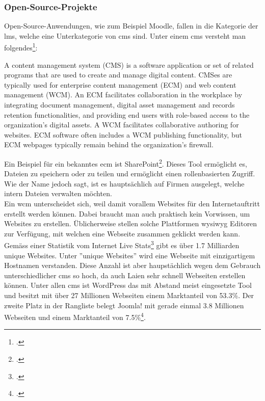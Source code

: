 \subsubsection*{Open-Source-Projekte}
Open-Source-Anwendungen, wie zum Beispiel Moodle, fallen in die Kategorie der \gls{lms}, welche eine Unterkategorie von \gls{cms} sind. Unter einem \gls{cms} versteht man folgendes\footcite{cms_definition}:

\begin{displayquote}
A content management system (CMS) is a software application or set of related programs that are used to create and manage digital content. CMSes are typically used for enterprise content management (ECM) and web content management (WCM). An ECM facilitates collaboration in the workplace by integrating document management, digital asset management and records retention functionalities, and providing end users with role-based access to the organization's digital assets. A WCM facilitates collaborative authoring for websites. ECM software often includes a WCM publishing functionality, but ECM webpages typically remain behind the organization's firewall.  
\end{displayquote}

Ein Beispiel für ein bekanntes \gls{ecm} ist SharePoint\footcite{sharepoint}. Dieses Tool ermöglicht es, Dateien zu speichern oder zu teilen und ermöglicht einen rollenbasierten Zugriff. Wie der Name jedoch sagt, ist es hauptsächlich auf Firmen ausgelegt, welche intern Dateien verwalten möchten. \\

Ein \gls{wcm} unterscheidet sich, weil damit vorallem Websites für den Internetauftritt erstellt werden können. Dabei braucht man auch praktisch kein Vorwissen, um Websites zu erstellen. Üblicherweise stellen solche Plattformen \gls{wysiwyg} Editoren zur Verfügung, mit welchen eine Webseite zusammen geklickt werden kann. Gemäss einer Statistik vom Internet Live Stats\footcite{internet_live_stats} gibt es über 1.7 Milliarden unique Websites. Unter ''unique Websites'' wird eine Webseite mit einzigartigem Hostnamen verstanden. Diese Anzahl ist aber haupstächlich wegen dem Gebrauch unterschiedlicher \gls{cms} so hoch, da auch Laien sehr schnell Webseiten erstellen können. Unter allen \gls{cms} ist WordPress das mit Abstand meist eingesetzte Tool und besitzt mit über 27 Millionen Webseiten einem Marktanteil von 53.3\%. Der zweite Platz in der Rangliste belegt Joomla! mit gerade einmal 3.8 Millionen Webseiten und einem Marktanteil von 7.5\%\footcite{cms_market_share}.\\

